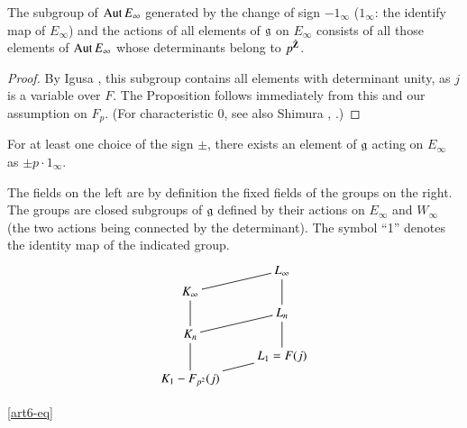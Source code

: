 \setcounter{subprop}{1}
\begin{subprop}[Igusa]\label{1.1.2}
The subgroup of $\operatorname{Aut} E_\infty$ generated by the change of sign $-1_\infty$ ($1_\infty$: the identify map of $E_\infty$) and the actions of all elements of $\mathfrak{g}$ on $E_\infty$ consists of all those elements of $\operatorname{Aut} E_\infty$ whose determinants belong to $p^{\hat{\mathbf{Z}}}$.
\end{subprop}

\begin{proof}
By Igusa \cite{art6-key5}, this subgroup contains all elements with determinant unity, as $j$ is a variable over $F$. The Proposition follows immediately from this and our assumption on $F_p$. (For characteristic 0, see also Shimura \cite{art6-17}, \cite{art6-18}.)
\end{proof}

\begin{coro*}
For at least one choice of the sign $\pm$, there exists an element of $\mathfrak{g}$ acting on $E_\infty$ as $\pm p \cdot 1_\infty$.
\end{coro*}

\begin{definitions*}
The fields on the left are by definition the fixed fields of the groups on the right. The groups are closed subgroups of $\mathfrak{g}$ defined by their actions on $E_\infty$ and $W_\infty$ (the two actions being connected by the determinant). The symbol ``1'' denotes the identity map of the indicated group.
$$
\xymatrix@R=0.1cm{
& L_\infty \ar@{-}[dd]\\
K_\infty \ar@{-}[ur] \ar@{-}[dd]& \\
& L_n \ar@{-}[dd] \\
K_n \ar@{-}[ur] \ar@{-}[dd]&\\
& L_1 = F(j)\\
K_1 - F_{p^2} (j) \ar@{-}[ur]& 
}
$$



\end{definitions*}


\eqref{art6-eq}
